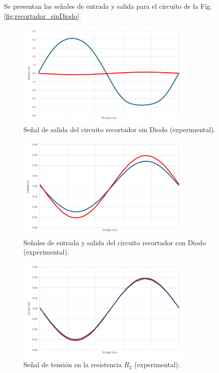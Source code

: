\documentclass[journal]{IEEEtran}
\begin{document}
Se presentan las señales de entrada y salida para el circuito de la Fig. \ref{fig:recortador_sinDiodo}.

\begin{figure}[H]
        \centering
        \includegraphics[width=3.4in]{C1111.png}
        \caption{Señal de salida del circuito recortador sin Diodo (experimental).}
        \label{fig:SignalExperimental_02}
\end{figure}

\begin{figure}[H]
        \centering
        \includegraphics[width=3.4in]{C2222.png}
        \caption{Señales de entrada y salida del circuito recortador con Diodo (experimental).}
        \label{fig:SignalExperimental_03}
\end{figure}

\begin{figure}[H]
        \centering
        \includegraphics[width=3.4in]{2C2222.png}
        \caption{Señal de tensión en la resistencia $R_2$ (experimental).}
        \label{fig:SignalExperimental_04}
\end{figure}
\end{document}
